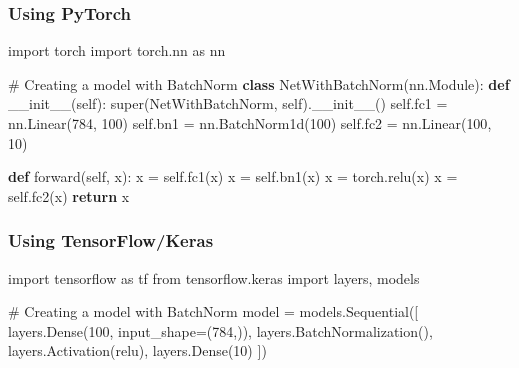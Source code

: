 \documentclass[
  letterpaper,
  DIV=11,
  numbers=noendperiod]{scrreprt}
\newenvironment{Shaded}{\begin{snugshade}}{\end{snugshade}}
\newcommand{\BuiltInTok}[1]{\textcolor[rgb]{0.00,0.23,0.31}{#1}}
\newcommand{\CommentTok}[1]{\textcolor[rgb]{0.37,0.37,0.37}{#1}}
\newcommand{\ControlFlowTok}[1]{\textcolor[rgb]{0.00,0.23,0.31}{\textbf{#1}}}
\newcommand{\DecValTok}[1]{\textcolor[rgb]{0.68,0.00,0.00}{#1}}
\newcommand{\FunctionTok}[1]{\textcolor[rgb]{0.28,0.35,0.67}{#1}}
\newcommand{\ImportTok}[1]{\textcolor[rgb]{0.00,0.46,0.62}{#1}}
\newcommand{\KeywordTok}[1]{\textcolor[rgb]{0.00,0.23,0.31}{\textbf{#1}}}
\newcommand{\NormalTok}[1]{\textcolor[rgb]{0.00,0.23,0.31}{#1}}
\newcommand{\OperatorTok}[1]{\textcolor[rgb]{0.37,0.37,0.37}{#1}}
\newcommand{\StringTok}[1]{\textcolor[rgb]{0.13,0.47,0.30}{#1}}
\newcommand{\VariableTok}[1]{\textcolor[rgb]{0.07,0.07,0.07}{#1}}
\begin{document}
\subsubsection{Using PyTorch}\label{using-pytorch}

\begin{Shaded}
\begin{Highlighting}[]
\ImportTok{import}\NormalTok{ torch}
\ImportTok{import}\NormalTok{ torch.nn }\ImportTok{as}\NormalTok{ nn}

\CommentTok{\# Creating a model with BatchNorm}
\KeywordTok{class}\NormalTok{ NetWithBatchNorm(nn.Module):}
    \KeywordTok{def} \FunctionTok{\_\_init\_\_}\NormalTok{(}\VariableTok{self}\NormalTok{):}
        \BuiltInTok{super}\NormalTok{(NetWithBatchNorm, }\VariableTok{self}\NormalTok{).}\FunctionTok{\_\_init\_\_}\NormalTok{()}
        \VariableTok{self}\NormalTok{.fc1 }\OperatorTok{=}\NormalTok{ nn.Linear(}\DecValTok{784}\NormalTok{, }\DecValTok{100}\NormalTok{)}
        \VariableTok{self}\NormalTok{.bn1 }\OperatorTok{=}\NormalTok{ nn.BatchNorm1d(}\DecValTok{100}\NormalTok{)}
        \VariableTok{self}\NormalTok{.fc2 }\OperatorTok{=}\NormalTok{ nn.Linear(}\DecValTok{100}\NormalTok{, }\DecValTok{10}\NormalTok{)}
        
    \KeywordTok{def}\NormalTok{ forward(}\VariableTok{self}\NormalTok{, x):}
\NormalTok{        x }\OperatorTok{=} \VariableTok{self}\NormalTok{.fc1(x)}
\NormalTok{        x }\OperatorTok{=} \VariableTok{self}\NormalTok{.bn1(x)}
\NormalTok{        x }\OperatorTok{=}\NormalTok{ torch.relu(x)}
\NormalTok{        x }\OperatorTok{=} \VariableTok{self}\NormalTok{.fc2(x)}
        \ControlFlowTok{return}\NormalTok{ x}
\end{Highlighting}
\end{Shaded}

\subsubsection{Using TensorFlow/Keras}\label{using-tensorflowkeras-1}

\begin{Shaded}
\begin{Highlighting}[]
\ImportTok{import}\NormalTok{ tensorflow }\ImportTok{as}\NormalTok{ tf}
\ImportTok{from}\NormalTok{ tensorflow.keras }\ImportTok{import}\NormalTok{ layers, models}

\CommentTok{\# Creating a model with BatchNorm}
\NormalTok{model }\OperatorTok{=}\NormalTok{ models.Sequential([}
\NormalTok{    layers.Dense(}\DecValTok{100}\NormalTok{, input\_shape}\OperatorTok{=}\NormalTok{(}\DecValTok{784}\NormalTok{,)),}
\NormalTok{    layers.BatchNormalization(),}
\NormalTok{    layers.Activation(}\StringTok{\textquotesingle{}relu\textquotesingle{}}\NormalTok{),}
\NormalTok{    layers.Dense(}\DecValTok{10}\NormalTok{)}
\NormalTok{])}
\end{Highlighting}
\end{Shaded}
\end{document}
